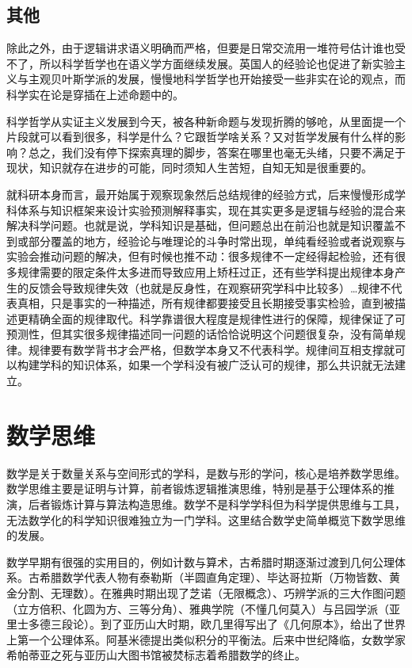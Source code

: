 \documentclass[]{tufte-book}
\begin{document}
\hypertarget{ux5176ux4ed6}{%
\subsection{其他}\label{ux5176ux4ed6}}

除此之外，由于逻辑讲求语义明确而严格，但要是日常交流用一堆符号估计谁也受不了，所以科学哲学也在语义学方面继续发展。英国人的经验论也促进了新实验主义与主观贝叶斯学派的发展，慢慢地科学哲学也开始接受一些非实在论的观点，而科学实在论是穿插在上述命题中的。

科学哲学从实证主义发展到今天，被各种新命题与发现折腾的够呛，从里面提一个片段就可以看到很多，科学是什么？它跟哲学啥关系？又对哲学发展有什么样的影响？总之，我们没有停下探索真理的脚步，答案在哪里也毫无头绪，只要不满足于现状，知识就存在进步的可能，同时须知人生苦短，自知无知是很重要的。

就科研本身而言，最开始属于观察现象然后总结规律的经验方式，后来慢慢形成学科体系与知识框架来设计实验预测解释事实，现在其实更多是逻辑与经验的混合来解决科学问题。也就是说，学科知识是基础，但问题总出在前沿也就是知识覆盖不到或部分覆盖的地方，经验论与唯理论的斗争时常出现，单纯看经验或者说观察与实验会推动问题的解决，但有时候也推不动：很多规律不一定经得起检验，还有很多规律需要的限定条件太多进而导致应用上矫枉过正，还有些学科提出规律本身产生的反馈会导致规律失效（也就是反身性，在观察研究学科中比较多）\ldots 规律不代表真相，只是事实的一种描述，所有规律都要接受且长期接受事实检验，直到被描述更精确全面的规律取代。科学靠谱很大程度是规律性进行的保障，规律保证了可预测性，但其实很多规律描述同一问题的话恰恰说明这个问题很复杂，没有简单规律。规律要有数学背书才会严格，但数学本身又不代表科学。规律间互相支撑就可以构建学科的知识体系，如果一个学科没有被广泛认可的规律，那么共识就无法建立。

\hypertarget{ux6570ux5b66ux601dux7ef4}{%
\section{数学思维}\label{ux6570ux5b66ux601dux7ef4}}

数学是关于数量关系与空间形式的学科，是数与形的学问，核心是培养数学思维。数学思维主要是证明与计算，前者锻炼逻辑推演思维，特别是基于公理体系的推演，后者锻炼计算与算法构造思维。数学不是科学学科但为科学提供思维与工具，无法数学化的科学知识很难独立为一门学科。这里结合数学史简单概览下数学思维的发展。

数学早期有很强的实用目的，例如计数与算术，古希腊时期逐渐过渡到几何公理体系。古希腊数学代表人物有泰勒斯（半圆直角定理）、毕达哥拉斯（万物皆数、黄金分割、无理数）。在雅典时期出现了芝诺（无限概念）、巧辨学派的三大作图问题（立方倍积、化圆为方、三等分角）、雅典学院（不懂几何莫入）与吕园学派（亚里士多德三段论）。到了亚历山大时期，欧几里得写出了《几何原本》，给出了世界上第一个公理体系。阿基米德提出类似积分的平衡法。后来中世纪降临，女数学家希帕蒂亚之死与亚历山大图书馆被焚标志着希腊数学的终止。
\end{document}

